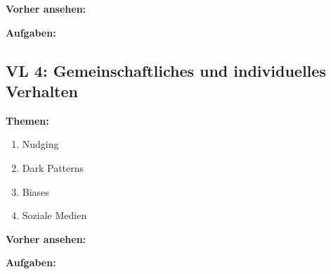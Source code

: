 \documentclass[a4paper]{article}%
\begin{document}
\textbf{Vorher ansehen:} 


\bigskip

\textbf{Aufgaben:}


\bigskip




\clearpage
\subsection{VL 4: Gemeinschaftliches und individuelles Verhalten }

\textbf{Themen:}

\begin{enumerate}
\item Nudging
\item Dark Patterns
\item Biases
\item Soziale Medien
\end{enumerate}


\textbf{Vorher ansehen:}



\bigskip

\textbf{Aufgaben:}
\end{document}
